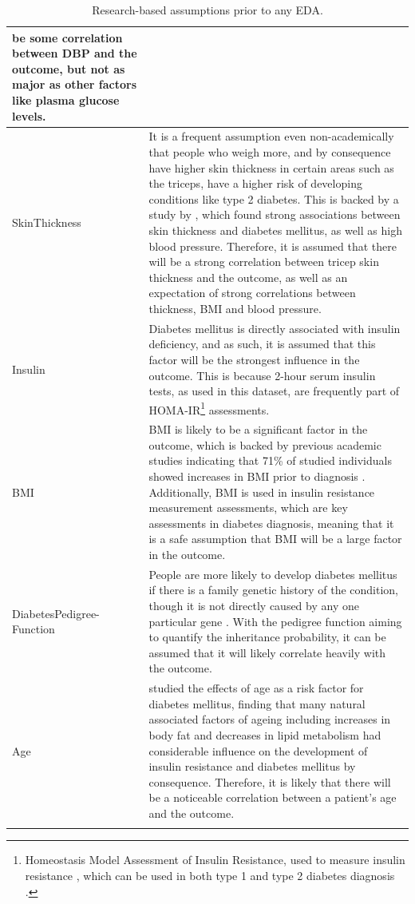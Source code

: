 \documentclass[12pt]{report}
\begin{document}
\begin{longtable}{ | p{} | p{} | }
    be some correlation between DBP and the outcome, but not as major as other factors like plasma glucose levels.\\
    \hline
    SkinThickness & It is a frequent assumption even non-academically that people who weigh more, and by consequence have higher 
    skin thickness in certain areas such as the triceps, have a higher risk of developing conditions like type 2 diabetes. This is 
    backed by a study by \textcite{ruiz-alejos_skinfold_2020}, which found strong associations between skin thickness and diabetes mellitus,
    as well as high blood pressure. Therefore, it is assumed that there will be a strong correlation between tricep skin thickness and the outcome, 
    as well as an expectation of strong correlations between thickness, BMI and blood pressure.\\
    \hline
    Insulin & Diabetes mellitus is directly associated with insulin deficiency, and as such, it is assumed that this factor will be 
    the strongest influence in the outcome. This is because 2-hour serum insulin tests, as used in this dataset, are frequently 
    part of HOMA-IR\footnote{Homeostasis Model Assessment of Insulin Resistance, used to measure insulin resistance \autocite{tahapary_challenges_2022}, which can be used in both type 1 and type 2 diabetes diagnosis \autocite{khalili_are_2023}.}
    assessments. \\
    \hline
    BMI & BMI is likely to be a significant factor in the outcome, which is backed by previous academic studies indicating that 71\% 
    of studied individuals showed increases in BMI prior to diagnosis \autocite{donnelly_trajectories_2024}. Additionally, BMI is used in insulin resistance measurement assessments,
    which are key assessments in diabetes diagnosis, meaning that it is a safe assumption that BMI will be a large factor in the outcome. \\
    \hline
    DiabetesPedigree- Function & People are more likely to develop diabetes mellitus if there is a family genetic history of the condition, though it is not 
    directly caused by any one particular gene \autocite{diabetes_uk_what_nodate}. With the pedigree function aiming 
    to quantify the inheritance probability, it can be assumed that it will likely correlate heavily with the outcome. \\
    \hline
    Age & \textcite{chackrewarthy_age_2012} studied the effects of age as a risk factor for diabetes mellitus, finding that many natural associated 
    factors of ageing including increases in body fat and decreases in lipid metabolism had considerable influence on the development of insulin 
    resistance and diabetes mellitus by consequence. Therefore, it is likely that there will be a noticeable correlation between a patient's age 
    and the outcome. 
     \\
    \hline
    \caption{Research-based assumptions prior to any EDA.}\label{tab:Assumptions}
\end{longtable}
\end{document}
